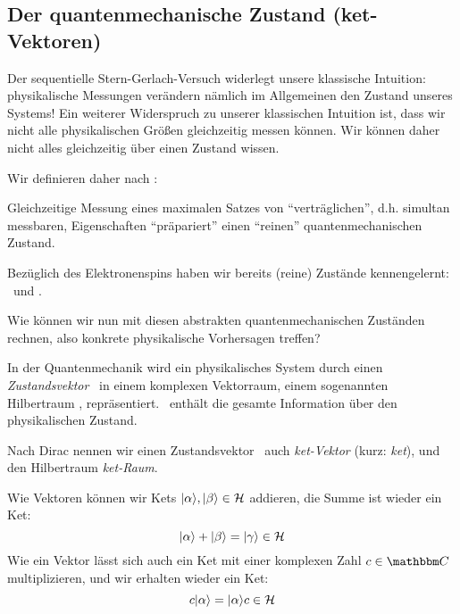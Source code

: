 \subsection{Der quantenmechanische Zustand (ket-Vektoren)}

Der sequentielle Stern-Gerlach-Versuch widerlegt unsere klassische Intuition: physikalische Messungen ver\"andern n\"amlich im Allgemeinen den Zustand unseres Systems! Ein weiterer Widerspruch zu unserer klassischen Intuition ist, dass wir nicht alle physikalischen Gr\"o\ss{}en gleichzeitig messen k\"onnen. Wir k\"onnen daher nicht alles gleichzeitig \"uber einen Zustand wissen.

Wir definieren daher nach \textcite{Nolting}:

\begin{post}
 Gleichzeitige Messung eines maximalen Satzes von \enquote{vertr\"aglichen}, d.h. simultan messbaren, Eigenschaften \enquote{pr\"apariert} einen \enquote{reinen} quantenmechanischen Zustand.
\end{post}

\begin{bsp}
 Bez\"uglich des Elektronenspins haben wir bereits (reine) Zust\"ande kennengelernt: \szus\ und \szds.
\end{bsp}

Wie k\"onnen wir nun mit diesen abstrakten quantenmechanischen Zust\"anden rechnen, also konkrete physikalische Vorhersagen treffen?

\begin{post}
 In der Quantenmechanik wird ein physikalisches System durch einen \emph{Zustandsvektor} \keta\ in einem komplexen Vektorraum, einem sogenannten Hilbertraum \hs, repr\"asentiert. \keta\ enth\"alt die gesamte Information \"uber den physikalischen Zustand. 
\end{post}

Nach Dirac nennen wir einen Zustandsvektor \keta\ auch \emph{ket-Vektor} (kurz: \emph{ket}), und den Hilbertraum \emph{ket-Raum}.

Wie Vektoren k\"onnen wir Kets $\keta, \ketb \in \hs$ addieren, die Summe ist wieder ein Ket:
\begin{equation*}
 \keta + \ketb = \ket{\gamma} \in \hs
\end{equation*}
Wie ein Vektor l\"asst sich auch ein Ket mit einer komplexen Zahl $c \in \comps$ multiplizieren, und wir erhalten wieder ein Ket:
\begin{equation*}
 c \keta = \keta c \in \hs
\end{equation*}

